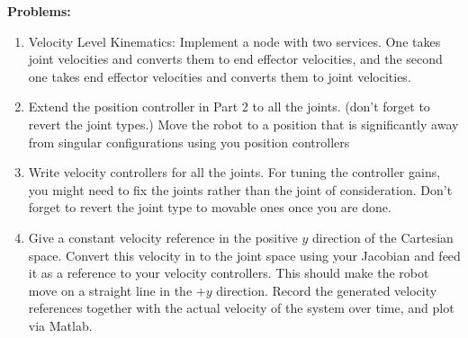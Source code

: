 \documentclass[10pt]{article}
\begin{document}
\textbf{Problems:}
\begin{enumerate}
	\item Velocity Level Kinematics: Implement a node with two services. One takes joint velocities and converts them to end effector velocities, and the second one takes end effector velocities and converts them to joint velocities.
	
	\item Extend the position controller in Part 2 to all the joints. (don't forget to revert the joint types.) Move the robot to a position that is significantly away from singular configurations using you position controllers
	
	\item Write velocity controllers for all the joints. For tuning the controller gains, you might need to fix the joints rather than the joint of consideration. Don't forget to revert the joint type to movable ones once you are done.
	
	\item Give a constant velocity reference in the positive $y$ direction of the Cartesian space. Convert this velocity in to the joint space using your Jacobian and feed it as a reference to your velocity controllers. This should make the robot move on a straight line in the $+y$ direction. Record the generated velocity references together with the actual velocity of the system over time, and plot via Matlab.
	
\end{enumerate}
\end{document}
